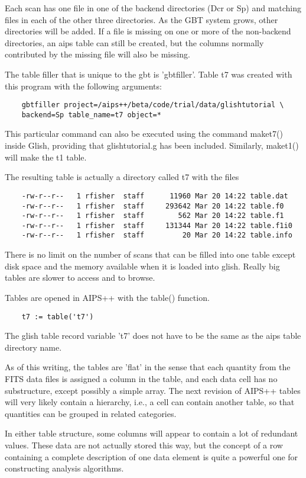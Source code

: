     Each scan has one file in one of the backend directories (Dcr or Sp)
and matching files in each of the other three directories.  As the GBT
system grows, other directories will be added.  If a file is missing on one
or more of the non-backend directories, an aips table can still be created,
but the columns normally contributed by the missing file will also be
missing.

    The table filler that is unique to the gbt is 'gbtfiller'.  Table t7
was created with this program with the following arguments:

\begin{verbatim}
	gbtfiller project=/aips++/beta/code/trial/data/glishtutorial \
	backend=Sp table_name=t7 object=*
\end{verbatim}

This particular command can also be executed using the command maket7()
inside Glish, providing that glishtutorial.g has been
included. Similarly, maket1() will make the t1 table.

The resulting table is actually a directory called t7 with the files

\begin{verbatim}
	-rw-r--r--   1 rfisher  staff      11960 Mar 20 14:22 table.dat
	-rw-r--r--   1 rfisher  staff     293642 Mar 20 14:22 table.f0
	-rw-r--r--   1 rfisher  staff        562 Mar 20 14:22 table.f1
	-rw-r--r--   1 rfisher  staff     131344 Mar 20 14:22 table.f1i0
	-rw-r--r--   1 rfisher  staff         20 Mar 20 14:22 table.info
\end{verbatim}

There is no limit on the number of scans that can be filled into one table
except disk space and the memory available when it is loaded into glish.
Really big tables are slower to access and to browse.

    Tables are opened in AIPS++ with the table() function.

\begin{verbatim}
	t7 := table('t7')
\end{verbatim}

The glish table record variable 't7' does not have to be the same as the
aips table directory name.

    As of this writing, the tables are 'flat' in the sense that each
quantity from the FITS data files is assigned a column in the table, and
each data cell has no substructure, except possibly a simple array.  The
next revision of AIPS++ tables will very likely contain a hierarchy, i.e.,
a cell can contain another table, so that quantities can be grouped in
related categories.

    In either table structure, some columns will appear to contain a lot of
redundant values.  These data are not actually stored this way, but the
concept of a row containing a complete description of one data element is
quite a powerful one for constructing analysis algorithms.

